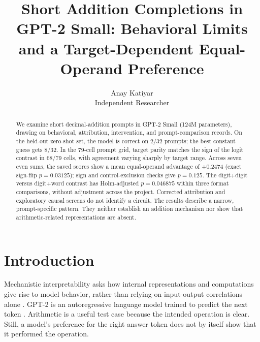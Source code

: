 \documentclass[11pt]{article}
\title{Short Addition Completions in GPT-2 Small: Behavioral Limits and a Target-Dependent Equal-Operand Preference}
\author{Anay Katiyar\\\small Independent Researcher}
\date{}
\begin{document}
\maketitle

\begin{abstract}
We examine short decimal-addition prompts in GPT-2 Small (124M parameters), drawing on behavioral, attribution, intervention, and prompt-comparison records. On the held-out zero-shot set, the model is correct on 2/32 prompts; the best constant guess gets 8/32. In the 79-cell prompt grid, target parity matches the sign of the logit contrast in 68/79 cells, with agreement varying sharply by target range. Across seven even sums, the saved scores show a mean equal-operand advantage of +0.2474 (exact sign-flip $p=0.03125$); sign and control-exclusion checks give $p=0.125$. The digit+digit versus digit+word contrast has Holm-adjusted $p=0.046875$ within three format comparisons, without adjustment across the project. Corrected attribution and exploratory causal screens do not identify a circuit. The results describe a narrow, prompt-specific pattern. They neither establish an addition mechanism nor show that arithmetic-related representations are absent.
\end{abstract}

\section{Introduction}

Mechanistic interpretability asks how internal representations and computations give rise to model behavior, rather than relying on input-output correlations alone \cite{elhage2021framework}. GPT-2 is an autoregressive language model trained to predict the next token \cite{radford2019gpt2}. Arithmetic is a useful test case because the intended operation is clear. Still, a model's preference for the right answer token does not by itself show that it performed the operation.
\end{document}
